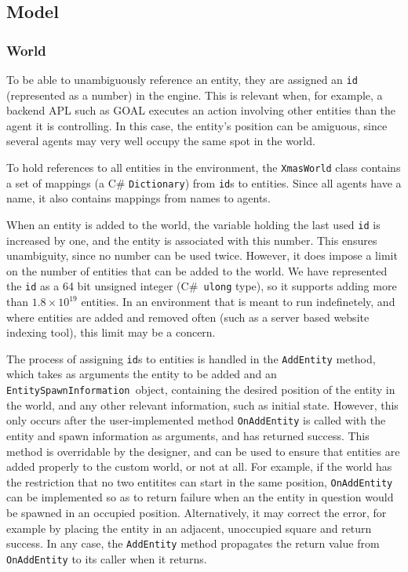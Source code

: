 
\subsection{Model}


\subsubsection{World}

To be able to unambiguously reference an entity, they are assigned
an \texttt{id} (represented as a number) in the engine. This is relevant
when, for example, a backend APL such as GOAL executes an action involving
other entities than the agent it is controlling. In this case, the
entity's position can be amiguous, since several agents may very well
occupy the same spot in the world.

To hold references to all entities in the environment, the \texttt{XmasWorld}
class contains a set of mappings (a C\# \texttt{Dictionary}) from
\texttt{id}s to entities. Since all agents have a name, it also contains
mappings from names to agents. 

When an entity is added to the world, the variable holding the last
used \texttt{id} is increased by one, and the entity is associated
with this number. This ensures unambiguity, since no number can be
used twice. However, it does impose a limit on the number of entities
that can be added to the world. We have represented the \texttt{id}
as a 64 bit unsigned integer (C\#\texttt{ ulong} type), so it supports
adding more than $1.8\times10^{19}$ entities. In an environment that
is meant to run indefinetely, and where entities are added and removed
often (such as a server based website indexing tool), this limit may
be a concern. 

The process of assigning \texttt{id}s to entities is handled in the
\texttt{AddEntity} method, which takes as arguments the entity to
be added and an \texttt{EntitySpawnInformation }object, containing
the desired position of the entity in the world, and any other relevant
information, such as initial state. However, this only occurs after
the user-implemented method \texttt{OnAddEntity} is called with the
entity and spawn information as arguments, and has returned success.
This method is overridable by the designer, and can be used to ensure
that entities are added properly to the custom world, or not at all.
For example, if the world has the restriction that no two entitites
can start in the same position, \texttt{OnAddEntity} can be implemented
so as to return failure when an the entity in question would be spawned
in an occupied position. Alternatively, it may correct the error,
for example by placing the entity in an adjacent, unoccupied square
and return success. In any case, the \texttt{AddEntity} method propagates
the return value from \texttt{OnAddEntity} to its caller when it returns.

